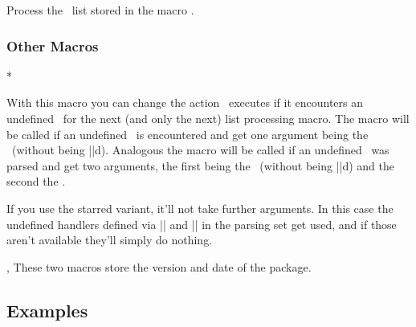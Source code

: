 \begin{function}{\ekvoProcessOptionsList}
  \begin{syntax}
  \end{syntax}
  Process the \kv\ list stored in the macro .
\end{function}
\expkvorules{}


\subsubsection{Other Macros\label{sec:o:others}}

\begin{function}{\ekvoUseUnknownHandlers}
  \begin{syntax}
    *
  \end{syntax}
  With this macro you can change the action \expkvo\ executes if it encounters
  an undefined \key\ for the next (and only the next) list processing macro. The
  macro  will be called if an undefined \Nkey\ is encountered and get
  one argument being the \key\ (without being |\detokenize|d). Analogous the
  macro  will be called if an undefined \Vkey\ was parsed and get two
  arguments, the first being the \key\ (without being |\detokenize|d) and the
  second the \val.
  \par
  If you use the starred variant, it'll not take further arguments. In this case
  the undefined handlers defined via |\ekvdefunknown| and |\ekvdefunknownNoVal|
  in the parsing set get used, and if those aren't available they'll simply do
  nothing.
\end{function}

\begin{function}{\ekvoVersion,\ekvoDate}
  These two macros store the version and date of the package.
\end{function}


\subsection{Examples}

